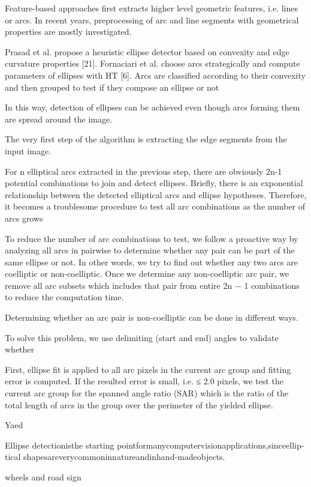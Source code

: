 \documentclass[a4paper]{report}
\begin{document}
Feature-based
approaches first extracts higher level geometric features, i.e. lines or arcs. In
recent years, preprocessing of arc and line segments with geometrical properties
are mostly investigated.

Prasad et al. propose a heuristic ellipse
detector based on convexity and edge curvature properties [21]. Fornaciari et al.
choose arcs strategically and compute parameters of ellipses with HT [6]. Arcs are
classified according to their convexity and then grouped to test if they compose
an ellipse or not

In this way, detection of
ellipses can be achieved even though arcs forming them are spread around
the image.

The very first step of the algorithm is extracting the edge segments from the
input image.

For n elliptical arcs extracted in the previous step, there are obviously 2n-1
potential combinations to join and detect ellipses.
Briefly, there is an exponential relationship between the detected elliptical
arcs and ellipse hypotheses. Therefore, it becomes a troublesome procedure to
test all arc combinations as the number of arcs grows

To reduce the number of arc combinations to test, we follow a proactive
way by analyzing all arcs in pairwise to determine whether any pair can be
part of the same ellipse or not. In other words, we try to find out whether any
two arcs are coelliptic or non-coelliptic. Once we determine any non-coelliptic
arc pair, we remove all arc subsets which includes that pair from entire 2n −
1 combinations to reduce the computation time.

Determining whether an arc
pair is non-coelliptic can be done in different ways.

To solve this problem, we use delimiting (start and
end) angles to validate whether

First, ellipse fit is applied to all arc pixels
in the current arc group and fitting error is computed. If the resulted error is
small, i.e. ≤ 2.0 pixels, we test the current arc group for the spanned angle ratio
(SAR) which is the ratio of the total length of arcs in the group over the perimeter
of the yielded ellipse.


Yaed

Ellipse detectionisthe
starting pointformanycomputervisionapplications,sinceellip-
tical shapesareverycommoninnatureandinhand-madeobjects.

wheels and road sign
\end{document}
